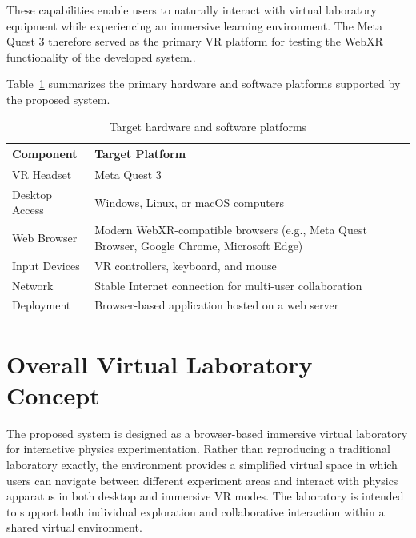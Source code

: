 These capabilities enable users to naturally interact with virtual laboratory
equipment while experiencing an immersive learning environment. The Meta Quest 3
therefore served as the primary VR platform for testing the WebXR functionality
of the developed system..

Table~\ref{tab:target_platforms} summarizes the primary hardware and software platforms supported by the proposed system.

\begin{table}[htbp]
\centering
\caption{Target hardware and software platforms}
\label{tab:target_platforms}

\renewcommand{\arraystretch}{1.3}

\begin{tabular}{p{4cm}p{9cm}}
\hline
\textbf{Component} & \textbf{Target Platform} \\
\hline

VR Headset &
Meta Quest 3 \\

Desktop Access &
Windows, Linux, or macOS computers \\

Web Browser &
Modern WebXR-compatible browsers (e.g., Meta Quest Browser, Google Chrome, Microsoft Edge) \\

Input Devices &
VR controllers, keyboard, and mouse \\

Network &
Stable Internet connection for multi-user collaboration \\

Deployment &
Browser-based application hosted on a web server \\

\hline
\end{tabular}
\end{table}
\FloatBarrier

\section{Overall Virtual Laboratory Concept}

The proposed system is designed as a browser-based immersive virtual laboratory
for interactive physics experimentation. Rather than reproducing a traditional
laboratory exactly, the environment provides a simplified virtual space in
which users can navigate between different experiment areas and interact with
physics apparatus in both desktop and immersive VR modes. The laboratory is
intended to support both individual exploration and collaborative interaction
within a shared virtual environment.

